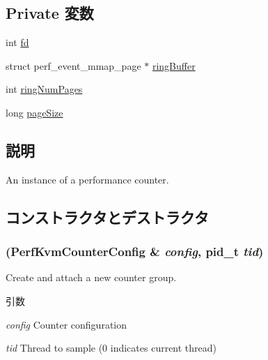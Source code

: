 \subsection*{Private 変数}
\begin{DoxyCompactItemize}
\item 
int \hyperlink{classPerfKvmCounter_a6f8059414f0228f0256115e024eeed4b}{fd}
\item 
struct perf\_\-event\_\-mmap\_\-page $\ast$ \hyperlink{classPerfKvmCounter_ab87c9aa7bfe943c16292c643bf6ceb58}{ringBuffer}
\item 
int \hyperlink{classPerfKvmCounter_ab445fb16e36d61f54c9c6ca0a9d8c8db}{ringNumPages}
\item 
long \hyperlink{classPerfKvmCounter_a055d35409d0ddd7689a36c45a8d9b89b}{pageSize}
\end{DoxyCompactItemize}


\subsection{説明}
An instance of a performance counter. 

\subsection{コンストラクタとデストラクタ}
\hypertarget{classPerfKvmCounter_a3efef81d1d840ff948b8fd501310c981}{
\subsubsection[{PerfKvmCounter}]{ ({\bf PerfKvmCounterConfig} \& {\em config}, \/  pid\_\-t {\em tid})}}
\label{classPerfKvmCounter_a3efef81d1d840ff948b8fd501310c981}
Create and attach a new counter group.


\begin{DoxyParams}{引数}
\item[{\em config}]Counter configuration \item[{\em tid}]Thread to sample (0 indicates current thread) \end{DoxyParams}



